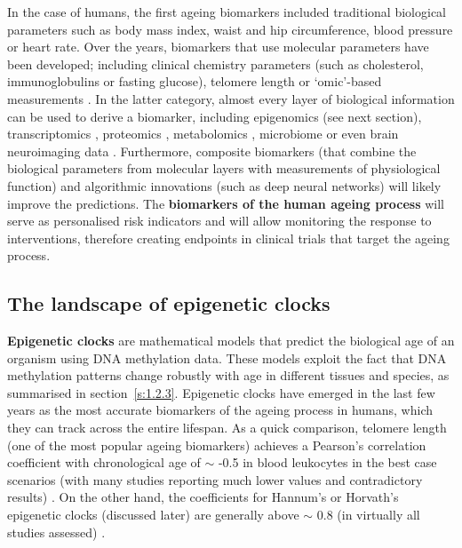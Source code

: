 In the case of humans, the first ageing biomarkers included traditional biological parameters such as body mass index, waist and hip circumference, blood pressure or heart rate. Over the years, biomarkers that use molecular parameters have been developed; including clinical chemistry parameters (such as cholesterol, immunoglobulins or fasting glucose), telomere length or `omic'-based measurements \cite{Burkle2015a,Jylhava2017}. In the latter category, almost every layer of biological information can be used to derive a biomarker, including epigenomics (see next section), transcriptomics \cite{Peters2015a}, proteomics \cite{Tanaka2018}, metabolomics \cite{Hertel2016}, microbiome \cite{Galkin2018} or even brain neuroimaging data \cite{Cole2017a}. Furthermore, composite biomarkers (that combine the biological parameters from molecular layers with measurements of physiological function) \cite{Khan2017} and algorithmic innovations (such as deep neural networks) \cite{Putin2016} will likely improve the predictions. The \textbf{biomarkers of the human ageing process} will serve as personalised risk indicators and will allow monitoring the response to interventions, therefore creating endpoints in clinical trials that target the ageing process.

\smallskip

\subsection{The landscape of epigenetic clocks}

\smallskip

\textbf{Epigenetic clocks} are mathematical models that predict the biological age of an organism using DNA methylation data. These models exploit the fact that DNA methylation patterns change robustly with age in different tissues and species, as summarised in section~\ref{s:1.2.3}. Epigenetic clocks have emerged in the last few years as the most accurate biomarkers of the ageing process in humans, which they can track across the entire lifespan. As a quick comparison, telomere length (one of the most popular ageing biomarkers) achieves a Pearson's correlation coefficient with chronological age of $\sim$ -0.5 in blood leukocytes in the best case scenarios (with many studies reporting much lower values and contradictory results) \cite{Newman2013}. On the other hand, the coefficients for Hannum's or Horvath's epigenetic clocks (discussed later) are generally above $\sim$ 0.8 (in virtually all studies assessed) \cite{Chen2016}.

